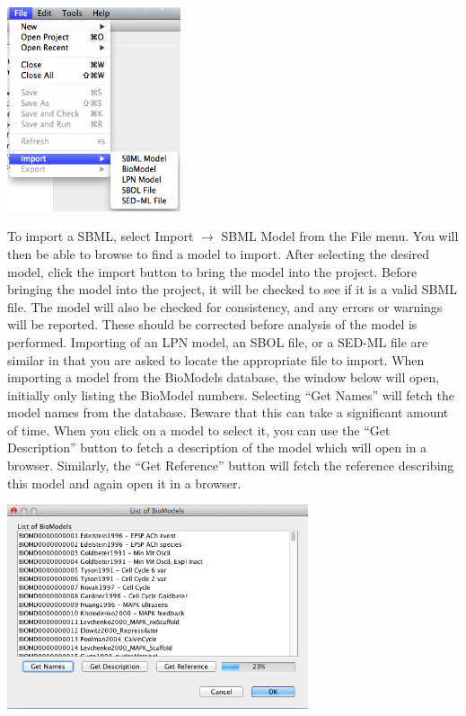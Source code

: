\documentclass[titlepage,11pt]{article}
\begin{document}
\begin{center}
\includegraphics[height=60mm]{screenshots/import}
\end{center} 

To import a SBML, select Import $\rightarrow$ SBML Model from the File menu.  
You will then be able to browse to find a model to import.  After  selecting the desired model, click the import button to bring the model into the project.  Before bringing the model into the project, it will be checked to see if it is a valid SBML file.  
The model will also be checked for consistency, and any errors or warnings will be reported.  These should be corrected before analysis of the model is performed.  Importing of an LPN model, an SBOL file, or a SED-ML file are similar in that you are asked to locate the appropriate file to import.  When importing a model from the BioModels database, the window below will open, initially only listing the BioModel numbers.  Selecting ``Get Names'' will fetch the model names from the database.  Beware that this can take a significant amount of time.  When you click on a model to select it, you can use the ``Get Description'' button to fetch a description of the model which will open in a browser.  Similarly, the ``Get Reference'' button will fetch the reference describing this model and again open it in a browser.

\begin{center}
\includegraphics[height=60mm]{screenshots/BioModels}
\end{center} 
\end{document}
